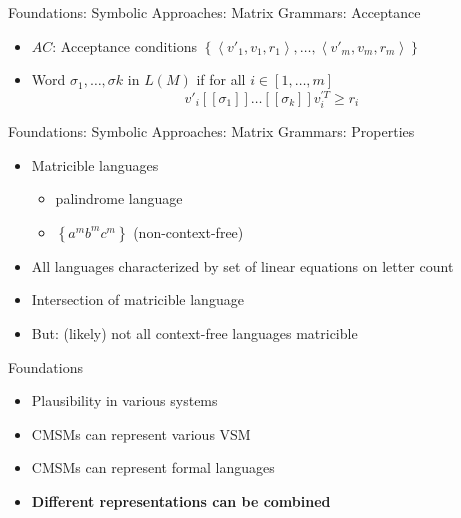 \documentclass[12pt,a4paper]{beamer}
\newcommand{\tuple}[1]{\ensuremath{\left \langle #1 \right \rangle }}
\newcommand{\setof}[1]{\ensuremath{\left \{ #1 \right \}}}
\begin{document}
\begin{frame}{Foundations: Symbolic Approaches: Matrix Grammars: Acceptance}
\begin{itemize}
\item $AC$: Acceptance conditions $ \setof{ \tuple{v'_{1}, v_{1}, r_{1}}, \ldots, \tuple{v'_{m}, v_{m}, r_{m}} }$
\item Word $\sigma_{1},\ldots,\sigma{k}$ in $L(M)$ if for all $i \in [1,\ldots,m]$ 
$$v'_{i}[[\sigma_{1}]] \ldots [[\sigma_{k}]] v_{i}^{'T} \ge r_{i}$$
\end{itemize}
\end{frame}


\begin{frame}{Foundations: Symbolic Approaches: Matrix Grammars: Properties}
\begin{itemize}
\item Matricible languages
\begin{itemize}
    \item palindrome language
    \item $\setof{ a^{m} b ^{m} c^{m}  }$ (non-context-free)
\end{itemize}
\item All languages characterized by set of linear equations on letter count
\item Intersection of matricible language
\item But: (likely) not all context-free languages matricible
\end{itemize}
\end{frame}



\begin{frame}{Foundations}
\begin{itemize}
\item Plausibility in various systems
\item CMSMs can represent various VSM
\item CMSMs can represent formal languages
\item \textbf{Different representations can be combined}
\end{itemize}
\end{frame}
\end{document}
